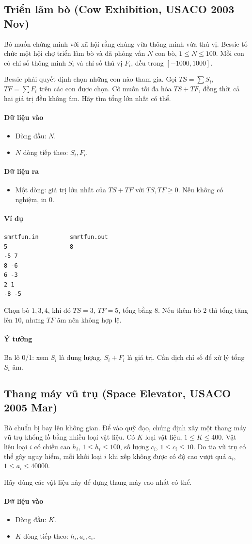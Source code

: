 \documentclass[11pt]{article}
\newcommand{\problem}[1]{\subsection{#1}}
\newcommand{\iosec}[1]{\paragraph{#1}}
\begin{document}
\problem{Triển lãm bò (Cow Exhibition, USACO 2003 Nov)}

Bò muốn chứng minh với xã hội rằng chúng vừa thông minh vừa thú vị. Bessie tổ chức một hội chợ triển lãm bò và đã phỏng vấn \(N\) con bò, \(1 \le N \le 100\). Mỗi con có chỉ số thông minh \(S_i\) và chỉ số thú vị \(F_i\), đều trong \([-1000,1000]\).

Bessie phải quyết định chọn những con nào tham gia. Gọi \(TS=\sum S_i\), \(TF=\sum F_i\) trên các con được chọn. Cô muốn tối đa hóa \(TS+TF\), đồng thời cả hai giá trị đều không âm. Hãy tìm tổng lớn nhất có thể.

\iosec{Dữ liệu vào}
\begin{itemize}
  \item Dòng đầu: \(N\).
  \item \(N\) dòng tiếp theo: \(S_i,F_i\).
\end{itemize}

\iosec{Dữ liệu ra}
\begin{itemize}
  \item Một dòng: giá trị lớn nhất của \(TS+TF\) với \(TS,TF\ge 0\). Nếu không có nghiệm, in \(0\).
\end{itemize}

\iosec{Ví dụ}
\begin{verbatim}
smrtfun.in         smrtfun.out
5                  8
-5 7
8 -6
6 -3
2 1
-8 -5
\end{verbatim}

Chọn bò \(1,3,4\), khi đó \(TS=3\), \(TF=5\), tổng bằng \(8\). Nếu thêm bò \(2\) thì tổng tăng lên \(10\), nhưng \(TF\) âm nên không hợp lệ.

\iosec{Ý tưởng}
Ba lô 0/1: xem \(S_i\) là dung lượng, \(S_i+F_i\) là giá trị. Cần dịch chỉ số để xử lý tổng \(S_i\) âm.

\problem{Thang máy vũ trụ (Space Elevator, USACO 2005 Mar)}

Bò chuẩn bị bay lên không gian. Để vào quỹ đạo, chúng định xây một thang máy vũ trụ khổng lồ bằng nhiều loại vật liệu. Có \(K\) loại vật liệu, \(1 \le K \le 400\). Vật liệu loại \(i\) có chiều cao \(h_i\), \(1 \le h_i \le 100\), số lượng \(c_i\), \(1 \le c_i \le 10\). Do tia vũ trụ có thể gây nguy hiểm, mỗi khối loại \(i\) khi xếp không được có độ cao vượt quá \(a_i\), \(1 \le a_i \le 40000\).

Hãy dùng các vật liệu này để dựng thang máy cao nhất có thể.

\iosec{Dữ liệu vào}
\begin{itemize}
  \item Dòng đầu: \(K\).
  \item \(K\) dòng tiếp theo: \(h_i,a_i,c_i\).
\end{itemize}
\end{document}
